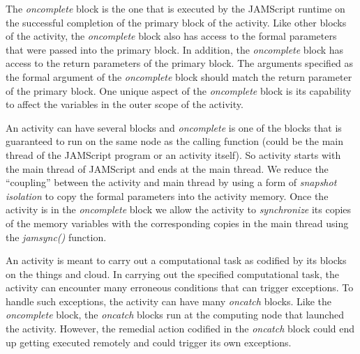 \documentclass[11pt]{article}
\begin{document}
The {\em oncomplete} block is the one that is executed by the JAMScript runtime
on the successful completion of the primary block of the activity. Like other
blocks of the activity, the {\em oncomplete} block also has access to the formal
parameters that were passed into the primary block. In addition, the {\em
oncomplete} block has access to the return parameters of the primary block. The
arguments specified as the formal argument of the {\em oncomplete} block should
match the return parameter of the primary block. One unique aspect of the {\em
oncomplete} block is its capability to affect the variables in the outer scope
of the activity.


An activity can have several blocks and {\em oncomplete} is one of the blocks
that is guaranteed to run on the same node as the calling function (could be the
main thread of the JAMScript program or an activity itself). So activity starts
with the main thread of JAMScript and ends at the main thread. We reduce the
``coupling'' between the activity and main thread by using a form of {\em
snapshot isolation} to copy the formal parameters into the activity memory. Once
the activity is in the {\em oncomplete} block we allow the activity to {\em
synchronize} its copies of the memory variables with the corresponding copies in
the main thread using the {\em jamsync()} function.



An activity is meant to carry out a computational task as codified by its blocks
on the things and cloud. In carrying out the specified computational task, the
activity can encounter many erroneous conditions that can trigger exceptions. To
handle such exceptions, the activity can have many {\em oncatch} blocks. Like
the {\em oncomplete} block, the {\em oncatch} blocks run at the computing node
that launched the activity. However, the remedial action codified in the {\em
oncatch} block could end up getting executed remotely and could trigger its own
exceptions.



\medskip
\end{document}
